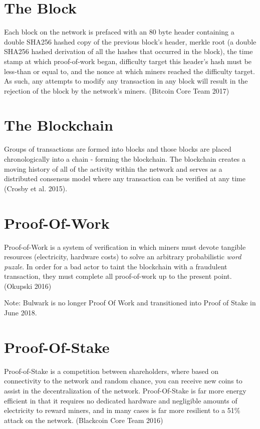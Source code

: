 \documentclass[11pt,a4paperpaper,]{report}
\begin{document}
\section{The Block}\label{the-block}

Each block on the network is prefaced with an 80 byte header containing
a double SHA256 hashed copy of the previous block's header, merkle root
(a double SHA256 hashed derivation of all the hashes that occurred in
the block), the time stamp at which proof-of-work began, difficulty
target this header's hash must be less-than or equal to, and the nonce
at which miners reached the difficulty target. As such, any attempts to
modify any transaction in any block will result in the rejection of the
block by the network's miners. (Bitcoin Core Team 2017)

\section{The Blockchain}\label{the-blockchain}

Groups of transactions are formed into blocks and those blocks are
placed chronologically into a chain - forming the blockchain. The
blockchain creates a moving history of all of the activity within the
network and serves as a distributed consensus model where any
transaction can be verified at any time (Crosby et al. 2015).

\section{Proof-Of-Work}\label{proof-of-work}

Proof-of-Work is a system of verification in which miners must devote
tangible resources (electricity, hardware costs) to solve an arbitrary
probabilistic \textit{word puzzle}. In order for a bad actor to taint
the blockchain with a fraudulent transaction, they must complete all
proof-of-work up to the present point. (Okupski 2016)

Note: Bulwark is no longer Proof Of Work and transitioned into Proof of
Stake in June 2018.

\section{Proof-Of-Stake}\label{proof-of-stake}

Proof-of-Stake is a competition between shareholders, where based on
connectivity to the network and random chance, you can receive new coins
to assist in the decentralization of the network. Proof-Of-Stake is far
more energy efficient in that it requires no dedicated hardware and
negligible amounts of electricity to reward miners, and in many cases is
far more resilient to a 51\% attack on the network. (Blackcoin Core Team
2016)
\end{document}
